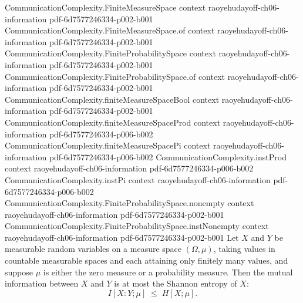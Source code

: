 \begin{theorem}
\proofstep
  {CommunicationComplexity.FiniteMeasureSpace}
  {context}
  {raoyehudayoff-ch06-information}
  {pdf-6d7577246334-p002-b001}
\proofstep
  {CommunicationComplexity.FiniteMeasureSpace.of}
  {context}
  {raoyehudayoff-ch06-information}
  {pdf-6d7577246334-p002-b001}
\proofstep
  {CommunicationComplexity.FiniteProbabilitySpace}
  {context}
  {raoyehudayoff-ch06-information}
  {pdf-6d7577246334-p002-b001}
\proofstep
  {CommunicationComplexity.FiniteProbabilitySpace.of}
  {context}
  {raoyehudayoff-ch06-information}
  {pdf-6d7577246334-p002-b001}
\proofstep
  {CommunicationComplexity.finiteMeasureSpaceBool}
  {context}
  {raoyehudayoff-ch06-information}
  {pdf-6d7577246334-p002-b001}
\proofstep
  {CommunicationComplexity.finiteMeasureSpaceProd}
  {context}
  {raoyehudayoff-ch06-information}
  {pdf-6d7577246334-p006-b002}
\proofstep
  {CommunicationComplexity.finiteMeasureSpacePi}
  {context}
  {raoyehudayoff-ch06-information}
  {pdf-6d7577246334-p006-b002}
\proofstep
  {CommunicationComplexity.instProd}
  {context}
  {raoyehudayoff-ch06-information}
  {pdf-6d7577246334-p006-b002}
\proofstep
  {CommunicationComplexity.instPi}
  {context}
  {raoyehudayoff-ch06-information}
  {pdf-6d7577246334-p006-b002}
\proofstep
  {CommunicationComplexity.FiniteProbabilitySpace.nonempty}
  {context}
  {raoyehudayoff-ch06-information}
  {pdf-6d7577246334-p002-b001}
\proofstep
  {CommunicationComplexity.FiniteProbabilitySpace.instNonempty}
  {context}
  {raoyehudayoff-ch06-information}
  {pdf-6d7577246334-p002-b001}
\label{ProbabilityTheory.mutualInfo_le_entropy_left}
\leanok
{}
Let $X$ and $Y$ be measurable random variables on a measure space $(\Omega,\mu)$, taking
values in countable measurable spaces and each attaining only finitely many values, and
suppose $\mu$ is either the zero measure or a probability measure. Then the mutual
information between $X$ and $Y$ is at most the Shannon entropy of $X$:
\[
  I[X : Y;\mu] \;\le\; H[X;\mu].
\]
\end{theorem}


